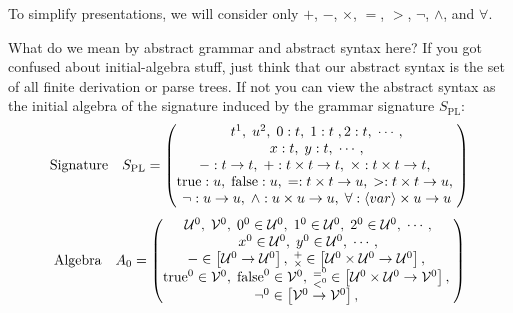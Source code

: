 \begin{enumcirc}
\begin{center}
\begin{minipage}{0.8\textwidth}
\begin{grammar}
			\end{grammar}
		\end{minipage}
	\end{center}
	To simplify presentations, we will consider only $+$, $-$, $\times$, $=$, $>$,
	$\neg$, $\wedge$, and $\forall$.
	\item
	What do we mean by abstract grammar and abstract syntax here?
	If you got confused about initial-algebra stuff, just think that our abstract
	syntax is the set of all finite derivation or parse trees.
	If not you can view the abstract syntax as the initial algebra of the signature
	induced by the grammar signature $S_{\textrm{PL}}$:
	\[
		\textrm{Signature} \quad S_{\textrm{PL}} =
		\begin{pmatrix}
			t\footnotemark,\; u\footnotemark,\; 0:t,\; 1:t\;, 2:t,\; \cdots,                                         \\
			x: t,\; y: t,\; \cdots ,                                                                                 \\
			- : t \rightarrow t,\; + : t \times t \rightarrow t,\; \times : t \times t \rightarrow t,\;              \\
			\textrm{true}: u,\; \textrm{false}: u,\; = : t \times t \rightarrow u,\; > : t \times t \rightarrow u,\; \\
			\neg: u \rightarrow u,\; \wedge: u \times u \rightarrow u,\; \forall: \chevrons{var} \times u \rightarrow u
		\end{pmatrix}
	\]
	\[
		\textrm{Algebra} \quad A_0 =
		\begin{pmatrix}
			\mathcal{U}^0,\; \mathcal{V}^0,\; 0^0 \in \mathcal{U}^0,\; 1^0 \in \mathcal{U}^0,\; 2^0 \in \mathcal{U}^0,\; \cdots, \\
			x^0 \in \mathcal{U}^0,\; y^0 \in \mathcal{U}^0,\; \cdots,                                                            \\
			- \in \left[ \mathcal{U}^0 \rightarrow \mathcal{U}^0 \right],\;
			\substack{+\\ \times} \in \left[ \mathcal{U}^0 \times \mathcal{U}^0 \rightarrow \mathcal{U}^0 \right],\;                            \\
			\textrm{true}^0 \in \mathcal{V}^0,\;
			\textrm{false}^0 \in \mathcal{V}^0,\;
			\substack{=^0\\<^0} \in \left[ \mathcal{U}^0 \times \mathcal{U}^0 \rightarrow \mathcal{V}^0 \right],\;                   \\
			\neg^0 \in \left[ \mathcal{V}^0 \rightarrow \mathcal{V}^0 \right],\;

\end{pmatrix}\]
\end{enumcirc}
